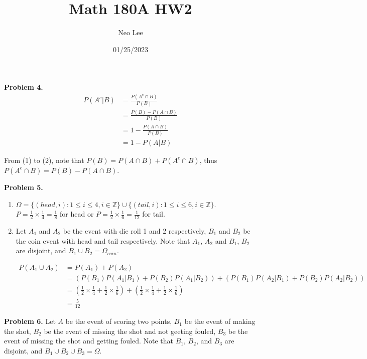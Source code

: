 \documentclass{article}
\title{Math 180A HW2}
\author{Neo Lee}
\date{01/25/2023}
\begin{document}
 

\maketitle 

\textbf{Problem 4.}
\begin{align}
    P(A^c | B) & = \frac{P(A^c \cap B)}{P(B)} \\
    & = \frac{P(B) - P(A \cap B)}{P(B)} \\ 
    & = 1 - \frac{P(A \cap B)}{P(B)} \\
    & = 1 - P(A | B) 
\end{align}

From (1) to (2), note that $P(B) = P(A \cap B) + P(A^c \cap B)$, thus $P(A^c \cap B) = P(B) - P(A \cap B)$.
\bigbreak

\textbf{Problem 5. }
\begin{enumerate}[label={(\alph*)}]
    \item  
    $\Omega = \{(head, i): 1 \le i \le 4, i \in \mathbb{Z} \} \cup \{(tail, i): 1 \le i \le 6, i \in \mathbb{Z} \}$. 
    $P = \frac{1}{2} \times \frac{1}{4} = \frac{1}{8}$ for head or $P = \frac{1}{2} \times \frac{1}{6} = \frac{1}{12}$ for tail.

    \item Let $A_1$ and $A_2$ be the event with die roll 1 and 2 respectively, $B_1$ and $B_2$ be the coin event with head and tail respectively. 
    Note that $A_1$, $A_2$ and $B_1$, $B_2$ are disjoint, and $B_1 \cup B_2 = \Omega_{coin}$.

    \begin{align}
        P(A_1 \cup A_2) & = P(A_1) + P(A_2) \\
        & = (P(B_1)P(A_1 | B_1) + P(B_2)P(A_1 | B_2)) + (P(B_1)P(A_2 | B_1) + P(B_2)P(A_2 | B_2)) \\ 
        & = (\frac{1}{2} \times \frac{1}{4} + \frac{1}{2} \times \frac{1}{6}) + (\frac{1}{2} \times \frac{1}{4} + \frac{1}{2} \times \frac{1}{6}) \\ 
        & = \frac{5}{12}
    \end{align}
\end{enumerate}
\bigbreak

\textbf{Problem 6.} 
Let $A$ be the event of scoring two points, $B_1$ be the event of making the shot, $B_2$ be the event of missing the shot and not geeting fouled, $B_3$ be the event of missing the shot and getting fouled. 
Note that $B_1$, $B_2$, and $B_3$ are disjoint, and $B_1 \cup B_2 \cup B_3 = \Omega$.
\end{document}

